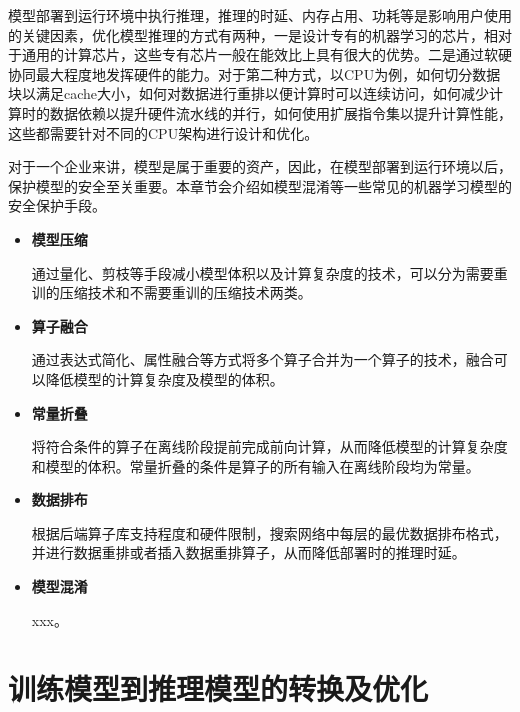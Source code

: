 模型部署到运行环境中执行推理，推理的时延、内存占用、功耗等是影响用户使用的关键因素，优化模型推理的方式有两种，一是设计专有的机器学习的芯片，相对于通用的计算芯片，这些专有芯片一般在能效比上具有很大的优势。二是通过软硬协同最大程度地发挥硬件的能力。对于第二种方式，以CPU为例，如何切分数据块以满足cache大小，如何对数据进行重排以便计算时可以连续访问，如何减少计算时的数据依赖以提升硬件流水线的并行，如何使用扩展指令集以提升计算性能，这些都需要针对不同的CPU架构进行设计和优化。

对于一个企业来讲，模型是属于重要的资产，因此，在模型部署到运行环境以后，保护模型的安全至关重要。本章节会介绍如模型混淆等一些常见的机器学习模型的安全保护手段。

\begin{itemize}
\item \textbf{模型压缩} 

通过量化、剪枝等手段减小模型体积以及计算复杂度的技术，可以分为需要重训的压缩技术和不需要重训的压缩技术两类。
\item \textbf{算子融合} 

通过表达式简化、属性融合等方式将多个算子合并为一个算子的技术，融合可以降低模型的计算复杂度及模型的体积。
\item \textbf{常量折叠} 

将符合条件的算子在离线阶段提前完成前向计算，从而降低模型的计算复杂度和模型的体积。常量折叠的条件是算子的所有输入在离线阶段均为常量。
\item \textbf{数据排布}

根据后端算子库支持程度和硬件限制，搜索网络中每层的最优数据排布格式，并进行数据重排或者插入数据重排算子，从而降低部署时的推理时延。
\item \textbf{模型混淆} 

xxx。
\end{itemize}

\section{训练模型到推理模型的转换及优化}\label{sec:ch09/ch09-model-optimization}
